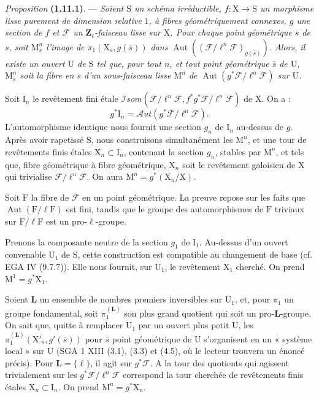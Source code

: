 \documentclass[11pt,leqno]{article}
\begin{document}
\textit{Proposition} \textbf{(1.11.1)}. — \textit{Soient \(\mathrm{S}\) un schéma irréductible, \(f:\mathrm{X}\to\mathrm{S}\) un morphisme lisse purement de dimension relative \(1\), à fibres géométriquement connexes, \(g\) une section de \(f\) et \(\mathscr{F}\) un \(\mathbf{Z}_\ell\)-faisceau lisse sur \(\mathrm{X}\). Pour chaque point géométrique \(\bar{s}\) de \(s\), soit \(\mathrm{M}_{\bar{s}}^n\) l’image de \(\pi_1(\mathrm{X}_{\bar{s}},g(\bar{s}))\) dans \(\operatorname{Aut}((\mathscr{F}/\ell^n\mathscr{F})_{g(\bar{s})})\). Alors, il existe un ouvert \(\mathrm{U}\) de \(\mathrm{S}\) tel que, pour tout \(n\), et tout point géométrique \(\bar{s}\) de \(\mathrm{U}\), \(\mathrm{M}_{\bar{s}}^n\) soit la fibre en \(\bar{s}\) d’un sous-faisceau lisse \(\mathrm{M}^n\) de \(\operatorname{Aut}(g^*\mathscr{F}/\ell^n\mathscr{F})\) sur \(\mathrm{U}\).}

Soit \(\mathrm{I}_n\) le revêtement fini étale \(\mathscr{I}\!som(\mathscr{F}/\ell^n\mathscr{F},f^*g^*\mathscr{F}/\ell^n\mathscr{F})\) de \(\mathrm{X}\). On a :
\[
g^*\mathrm{I}_n=\mathscr{A}\!ut(g^*\mathscr{F}/\ell^n\mathscr{F}).
\]
L’automorphisme identique nous fournit une section \(g_n\) de \(\mathrm{I}_n\) au-dessus de \(g\). Après avoir rapetissé \(\mathrm{S}\), nous construisons simultanément les \(\mathrm{M}^n\), et une tour de revêtements finis étales \(\mathrm{X}_n\subset\mathrm{I}_n\), contenant la section \(g_n\), stables par \(\mathrm{M}^n\), et tels que, fibre géométrique à fibre géométrique, \(\mathrm{X}_n\) soit le revêtement galoisien de \(\mathrm{X}\) qui trivialise \(\mathscr{F}/\ell^n\mathscr{F}\). On aura \(\mathrm{M}^n=g^*(\mathrm{X}_n/\mathrm{X})\).

Soit \(\mathrm{F}\) la fibre de \(\mathscr{F}\) en un point géométrique. La preuve repose sur les faits que \(\operatorname{Aut}(\mathrm{F}/\ell\mathrm{F})\) est fini, tandis que le groupe des automorphismes de \(\mathrm{F}\) triviaux sur \(\mathrm{F}/\ell\mathrm{F}\) est un pro-\(\ell\)-groupe.

Prenons la composante neutre de la section \(g_1\) de \(\mathrm{I}_1\). Au-dessus d’un ouvert convenable \(\mathrm{U}_1\) de \(\mathrm{S}\), cette construction est compatible au changement de base (cf. EGA IV (9.7.7)). Elle nous fournit, sur \(\mathrm{U}_1\), le revêtement \(\mathrm{X}_1\) cherché. On prend \(\mathrm{M}^1=g^*\mathrm{X}_1\).

Soient \(\mathbf{L}\) un ensemble de nombres premiers inversibles sur \(\mathrm{U}_1\), et, pour \(\pi_1\) un groupe fondamental, soit \(\pi_1^{(\mathbf{L})}\) son plus grand quotient qui soit un pro-\(\mathbf{L}\)-groupe. On sait que, quitte à remplacer \(\mathrm{U}_1\) par un ouvert plus petit \(\mathrm{U}\), les \(\pi_1^{(\mathbf{L})}(\mathrm{X}'_{\bar{s}},g'(\bar{s}))\) pour \(\bar{s}\) point géométrique de \(\mathrm{U}\) s’organisent en un « système local » sur \(\mathrm{U}\) (SGA 1 XIII (3.1), (3.3) et (4.5), où le lecteur trouvera un énoncé précis). Pour \(\mathbf{L}=\{\ell\}\), il agit sur \(g^*\mathscr{F}\). A la tour des quotients qui agissent trivialement sur les \(g^*\mathscr{F}/\ell^n\mathscr{F}\) correspond la tour cherchée de revêtements finis étales \(\mathrm{X}_n\subset\mathrm{I}_n\). On prend \(\mathrm{M}^n=g^*\mathrm{X}_n\).
\end{document}
